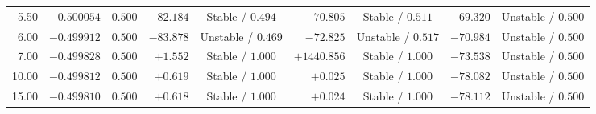 \documentclass[journal]{IEEEtran}
\begin{document}
\begin{table}[t]
\begin{tabular}{rccrcrcrc}
5.50  & $-0.500054$ & $0.500$ & $-82.184$ & Stable / $0.494$ & $-70.805$ & Stable / $0.511$ & $-69.320$ & Unstable / $0.500$ \\
6.00  & $-0.499912$ & $0.500$ & $-83.878$ & Unstable / $0.469$ & $-72.825$ & Unstable / $0.517$ & $-70.984$ & Unstable / $0.500$ \\
7.00  & $-0.499828$ & $0.500$ & $+1.552$  & Stable / $1.000$ & $+1440.856$ & Stable / $1.000$ & $-73.538$ & Unstable / $0.500$ \\
10.00 & $-0.499812$ & $0.500$ & $+0.619$  & Stable / $1.000$ & $+0.025$  & Stable / $1.000$ & $-78.082$ & Unstable / $0.500$ \\
15.00 & $-0.499810$ & $0.500$ & $+0.618$  & Stable / $1.000$ & $+0.024$  & Stable / $1.000$ & $-78.112$ & Unstable / $0.500$ \\
\bottomrule
\end{tabular}
\end{table}
\end{document}
